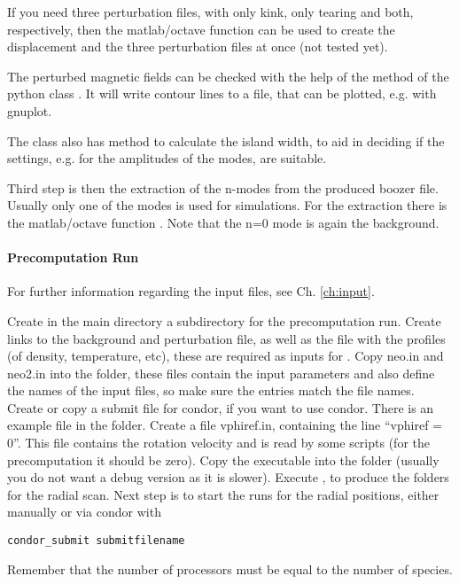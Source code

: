 If you need three perturbation files, with only kink, only tearing and
both, respectively, then the matlab/octave function
 can be used to create the
displacement and the three perturbation files at once (not tested yet).

The perturbed magnetic fields can be checked with the help of the
method  of the python class
. It will write contour lines to a file, that can be
plotted, e.g. with gnuplot.

The class also has method  to
calculate the island width, to aid in
deciding if the settings, e.g. for the amplitudes of the modes, are
suitable.

Third step is then the extraction of the n-modes from the produced
boozer file. Usually only one of the modes is used for simulations.
For the extraction there is the matlab/octave function
.
Note that the n=0 mode is again the background.


\paragraph{Precomputation Run}
For further information regarding the input files, see Ch. \ref{ch:input}.

Create in the main directory a subdirectory for the precomputation run.
Create links to the background and perturbation file, as well as the
file with the profiles (of density, temperature, etc), these are required
as inputs for \neotwo.
Copy neo.in and neo2.in into the folder, these files contain the input
parameters and also define the names of the input files, so make sure
the entries match the file names. Create or copy a submit file
for condor, if you want to use condor. There is an example file in the
 folder. Create a file vphiref.in, containing the line
``vphiref = 0''. This file contains the rotation velocity and is read by
some scripts (for the precomputation it should be zero). Copy the
\neotwo executable into the folder (usually you do not want a debug
version as it is slower). Execute \neotwo, to produce the folders for
the radial scan. Next step is to start the runs for the radial
positions, either manually or via condor with
\begin{verbatim}
condor_submit submitfilename
\end{verbatim}

Remember that the number of processors must be equal to the number of
species.

